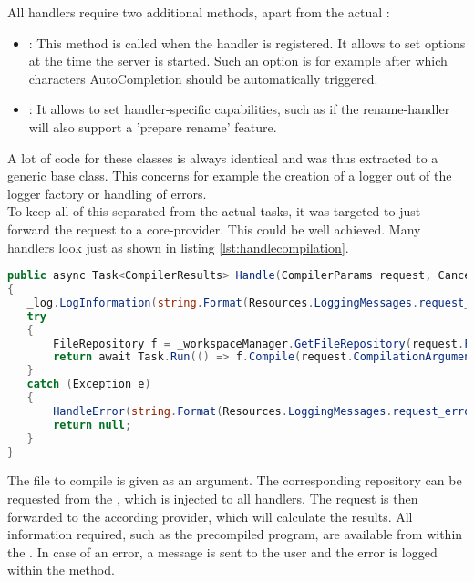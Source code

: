 All handlers require two additional methods, apart from the actual :
\begin{itemize}
    \item {}: This method is called when the handler is registered.
    It allows to set options at the time the server is started.
    Such an option is for example after which characters AutoCompletion should be automatically triggered.
    \item {}: It allows to set handler-specific capabilities, such as if the rename-handler will also support a 'prepare rename' feature.
\end{itemize}

A lot of code for these classes is always identical and was thus extracted to a generic base class.
This concerns for example the creation of a logger out of the logger factory or handling of errors.\\

To keep all of this separated from the actual tasks, it was targeted to just forward the request to a core-provider.
This could be well achieved.
Many handlers look just as shown in listing \ref{lst:handlecompilation}.

\begin{lstlisting}[language=csharp, caption={Handling Compilation}, captionpos=b, label={lst:handlecompilation}]
public async Task<CompilerResults> Handle(CompilerParams request, CancellationToken cancellationToken)
{
   _log.LogInformation(string.Format(Resources.LoggingMessages.request_handle, _method));
   try
   {
       FileRepository f = _workspaceManager.GetFileRepository(request.FileToCompile);
       return await Task.Run(() => f.Compile(request.CompilationArguments), cancellationToken);
   }
   catch (Exception e)
   {
       HandleError(string.Format(Resources.LoggingMessages.request_error, _method), e);
       return null;
   }
}
\end{lstlisting}

The file to compile is given as an argument.
The corresponding repository can be requested from the , which is injected to all handlers.
The request is then forwarded to the according provider, which will calculate the results.
All information required, such as the precompiled program, are available from within the .
In case of an error, a message is sent to the user and the error is logged within the  method.\\

